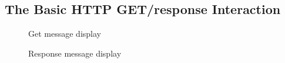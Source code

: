 \documentclass[11pt]{article}
\numberwithin{equation}{section}
\begin{document}
\subsection*{ The Basic HTTP GET/response Interaction}

\begin{figure}[H]
\begin{center}
		\centering
		\caption{Get message display}
		\label{fig:q1_f1_a}
\end{center}
\end{figure} 

\begin{figure}[H]
\begin{center}
		\centering
		\caption{Response message display}
		\label{fig:q1_f1_a}
\end{center}
\end{figure} 


\end{document}

